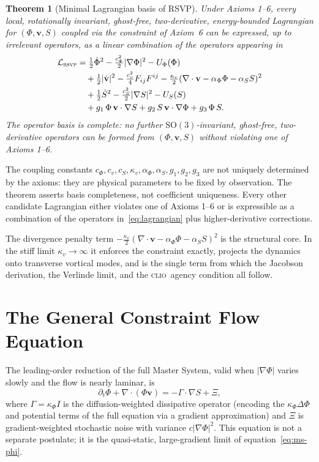 \documentclass[12pt, oneside]{book}
\theoremstyle{plain}
\newtheorem{theorem}{Theorem}[chapter]
\theoremstyle{definition}
\newcommand{\vfield}{\mathbf{v}}
\newcommand{\RSVP}{\textsc{rsvp}}
\newcommand{\CLIO}{\textsc{clio}}
\newcommand{\nab}{\nabla}
\begin{document}
\begin{theorem}[Minimal Lagrangian basis of RSVP]
\label{thm:lagrangian}
Under Axioms 1--6, every local, rotationally invariant, ghost-free, two-derivative,
energy-bounded Lagrangian for $(\Phi, \vfield, S)$ coupled via the constraint of
Axiom~6 can be expressed, up to irrelevant operators, as a linear combination of the
operators appearing in
\begin{align}
\mathcal{L}_{\RSVP}
&= \tfrac{1}{2}\dot{\Phi}^2 - \tfrac{c_\Phi^2}{2}|\nab\Phi|^2 - U_\Phi(\Phi)
\nonumber\\
&\quad + \tfrac{1}{2}|\dot{\vfield}|^2 - \tfrac{c_v^2}{4}F_{ij}F^{ij}
  - \tfrac{\kappa_v}{2}(\nab\cdot\vfield - \alpha_\Phi\Phi - \alpha_S S)^2
\nonumber\\
&\quad + \tfrac{1}{2}\dot{S}^2 - \tfrac{c_S^2}{2}|\nab S|^2 - U_S(S)
\nonumber\\
&\quad + g_1\,\Phi\,\vfield\cdot\nab S
  + g_2\,S\,\vfield\cdot\nab\Phi
  + g_3\,\Phi\,S.
\label{eq:lagrangian}
\end{align}
The operator basis is complete: no further $\mathrm{SO}(3)$-invariant, ghost-free,
two-derivative operators can be formed from $(\Phi, \vfield, S)$ without violating
one of Axioms 1--6.
\end{theorem}

The coupling constants $c_\Phi, c_v, c_S, \kappa_v, \alpha_\Phi, \alpha_S, g_1,
g_2, g_3$ are not uniquely determined by the axioms: they are physical parameters
to be fixed by observation. The theorem asserts basis completeness, not coefficient
uniqueness. Every other candidate Lagrangian either violates one of Axioms 1--6
or is expressible as a combination of the operators in~\eqref{eq:lagrangian} plus
higher-derivative corrections.

The divergence penalty term $-\tfrac{\kappa_v}{2}(\nab\cdot\vfield
- \alpha_\Phi\Phi - \alpha_S S)^2$ is the structural core. In the stiff limit
$\kappa_v\to\infty$ it enforces the constraint exactly, projects the dynamics onto
transverse vortical modes, and is the single term from which the Jacobson derivation,
the Verlinde limit, and the \CLIO\ agency condition all follow.

\section{The General Constraint Flow Equation}
\label{sec:gcfe}

The leading-order reduction of the full Master System, valid when $|\nab\Phi|$
varies slowly and the flow is nearly laminar, is
\begin{equation}
  \partial_t\Phi + \nab\cdot(\Phi\vfield) = -\Gamma\cdot\nab S + \Xi,
  \label{eq:gcfe}
\end{equation}
where $\Gamma = \kappa_\Phi I$ is the diffusion-weighted dissipative operator
(encoding the $\kappa_\Phi\Delta\Phi$ and potential terms of the full equation via
a gradient approximation) and $\Xi$ is gradient-weighted stochastic noise with
variance $c|\nab\Phi|^2$. This equation is not a separate postulate; it is the
quasi-static, large-gradient limit of equation~\eqref{eq:ms-phi}.
\end{document}
